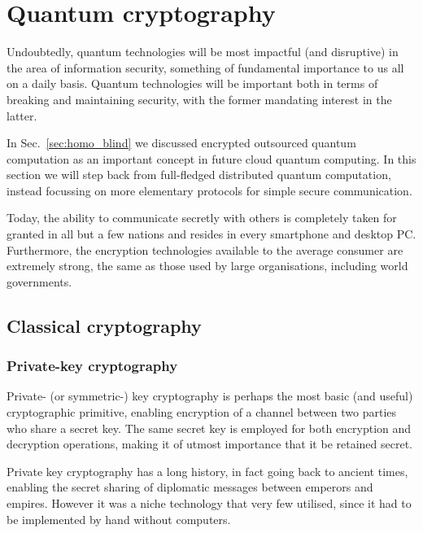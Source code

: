 %
%

\section{Quantum cryptography}\label{sec:cryptowars}




Undoubtedly, quantum technologies will be most impactful (and disruptive) in the area of information security, something of fundamental importance to us all on a daily basis. Quantum technologies will be important both in terms of breaking and maintaining security, with the former mandating interest in the latter.

In Sec.~\ref{sec:homo_blind} we discussed encrypted outsourced quantum computation as an important concept in future cloud quantum computing. In this section we will step back from full-fledged distributed quantum computation, instead focussing on more elementary protocols for simple secure communication.

Today, the ability to communicate secretly with others is completely taken for granted in all but a few nations and resides in every smartphone and desktop PC. Furthermore, the encryption technologies available to the average consumer are extremely strong, the same as those used by large organisations, including world governments.

\subsection{Classical cryptography}

\subsubsection{Private-key cryptography}

Private- (or symmetric-) key cryptography is perhaps the most basic (and useful) cryptographic primitive, enabling encryption of a channel between two parties who share a secret key. The same secret key is employed for both encryption and decryption operations, making it of utmost importance that it be retained secret.

Private key cryptography has a long history, in fact going back to ancient times, enabling the secret sharing of diplomatic messages between emperors and empires. However it was a niche technology that very few utilised, since it had to be implemented by hand without computers.


